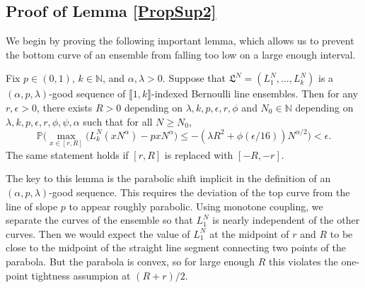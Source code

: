\subsection{Proof of Lemma \ref{PropSup2}}\label{Section5.2}

	We begin by proving the following important lemma, which allows us to prevent the bottom curve of an ensemble from falling too low on a large enough interval.
	
	\begin{lemma}\label{21}
		Fix $p\in (0,1)$, $k\in\mathbb{N}$, and $\alpha,\lambda > 0$. Suppose that $\mathfrak{L}^N = (L_1^N, \dots, L_k^N)$ is a $(\alpha,p,\lambda)$-good sequence of $\llbracket 1, k\rrbracket$-indexed Bernoulli line ensembles. Then for any $r,\epsilon>0$, there exists $R>0$ depending on $\lambda,k,p,\epsilon,r,\phi$ and $N_0 \in \mathbb{N}$ depending on $\lambda,k,p,\epsilon,r,\phi,\psi,\alpha$ such that for all $N\geq N_0$,
		\[
		\mathbb{P}\Big(\max_{x\in[r,R]} \big(L_k^N(xN^\alpha) - pxN^\alpha\big) \leq -(\lambda R^2 + \phi(\epsilon/16))N^{\alpha/2}\Big) < \epsilon.
		\]
		The same statement holds if $[r,R]$ is replaced with $[-R,-r]$.
	\end{lemma}

	\begin{remark}
		The key to this lemma is the parabolic shift implicit in the definition of an $(\alpha,p,\lambda)$-good sequence. This requires the deviation of the top curve from the line of slope $p$ to appear roughly parabolic. Using monotone coupling, we separate the curves of the ensemble so that $L_1^N$ is nearly independent of the other curves. Then we would expect the value of $L_1^N$ at the midpoint of $r$ and $R$ to be close to the midpoint of the straight line segment connecting two points of the parabola. But the parabola is convex, so for large enough $R$ this violates the one-point tightness assumpion at $(R+r)/2$.
	\end{remark}
	
